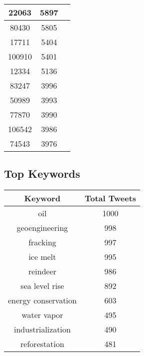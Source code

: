 \documentclass{article}\usepackage[T1]{fontenc}
\begin{document}
\begin{tabular}{|c|c|c|}
 \hline
22063 & 5897\\ 
 \hline
80430 & 5805\\ 
 \hline
17711 & 5404\\ 
 \hline
100910 & 5401\\ 
 \hline
12334 & 5136\\ 
 \hline
83247 & 3996\\ 
 \hline
50989 & 3993\\ 
 \hline
77870 & 3990\\ 
 \hline
106542 & 3986\\ 
 \hline
74543 & 3976\\ 
 \hline
\end{tabular}\subsection*{Top Keywords}\begin{tabular}{|c|c|}         \hline         Keyword & Total Tweets \\ 
 \hline
oil & 1000\\ 
 \hline
geoengineering & 998\\ 
 \hline
fracking & 997\\ 
 \hline
ice melt & 995\\ 
 \hline
reindeer & 986\\ 
 \hline
sea level rise & 892\\ 
 \hline
energy conservation & 603\\ 
 \hline
water vapor & 495\\ 
 \hline
industrialization & 490\\ 
 \hline
reforestation & 481\\ 
 \hline
\end{tabular}
\end{document}
